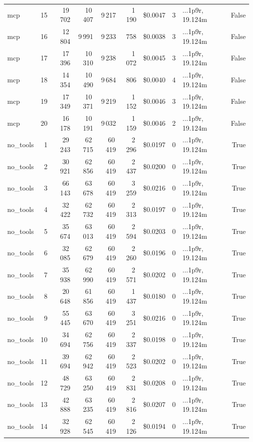 \documentclass[a4paper,11pt]{article}
\begin{document}
\begin{table}[H]
{\begin{tabular}{l r r r r r r r l r}
mcp & 15 & 19\,702 & 10\,407 & 9\,217 & 1\,190 & \$0.0047 & 3 & ...1p9r, 19.124m & False \\
mcp & 16 & 12\,804 & 9\,991 & 9\,233 & 758 & \$0.0038 & 3 & ...1p9r, 19.124m & False \\
mcp & 17 & 17\,396 & 10\,310 & 9\,238 & 1\,072 & \$0.0045 & 3 & ...1p9r, 19.124m & False \\
mcp & 18 & 14\,354 & 10\,490 & 9\,684 & 806 & \$0.0040 & 4 & ...1p9r, 19.124m & False \\
mcp & 19 & 17\,349 & 10\,371 & 9\,219 & 1\,152 & \$0.0046 & 3 & ...1p9r, 19.124m & False \\
mcp & 20 & 16\,178 & 10\,191 & 9\,032 & 1\,159 & \$0.0046 & 2 & ...1p9r, 19.124m & False \\
\midrule
no\_tools & 1 & 29\,243 & 62\,715 & 60\,419 & 2\,296 & \$0.0197 & 0 & ...1p9r, 19.124m & True \\
no\_tools & 2 & 30\,921 & 62\,856 & 60\,419 & 2\,437 & \$0.0200 & 0 & ...1p9r, 19.124m & True \\
no\_tools & 3 & 66\,143 & 63\,678 & 60\,419 & 3\,259 & \$0.0216 & 0 & ...1p9r, 19.124m & True \\
no\_tools & 4 & 32\,422 & 62\,732 & 60\,419 & 2\,313 & \$0.0197 & 0 & ...1p9r, 19.124m & True \\
no\_tools & 5 & 35\,674 & 63\,013 & 60\,419 & 2\,594 & \$0.0203 & 0 & ...1p9r, 19.124m & True \\
no\_tools & 6 & 32\,085 & 62\,679 & 60\,419 & 2\,260 & \$0.0196 & 0 & ...1p9r, 19.124m & True \\
no\_tools & 7 & 35\,938 & 62\,990 & 60\,419 & 2\,571 & \$0.0202 & 0 & ...1p9r, 19.124m & True \\
no\_tools & 8 & 20\,648 & 61\,856 & 60\,419 & 1\,437 & \$0.0180 & 0 & ...1p9r, 19.124m & True \\
no\_tools & 9 & 55\,445 & 63\,670 & 60\,419 & 3\,251 & \$0.0216 & 0 & ...1p9r, 19.124m & True \\
no\_tools & 10 & 34\,694 & 62\,756 & 60\,419 & 2\,337 & \$0.0198 & 0 & ...1p9r, 19.124m & True \\
no\_tools & 11 & 39\,694 & 62\,942 & 60\,419 & 2\,523 & \$0.0202 & 0 & ...1p9r, 19.124m & True \\
no\_tools & 12 & 48\,729 & 63\,250 & 60\,419 & 2\,831 & \$0.0208 & 0 & ...1p9r, 19.124m & True \\
no\_tools & 13 & 42\,888 & 63\,235 & 60\,419 & 2\,816 & \$0.0207 & 0 & ...1p9r, 19.124m & True \\
no\_tools & 14 & 32\,928 & 62\,545 & 60\,419 & 2\,126 & \$0.0194 & 0 & ...1p9r, 19.124m & True \\

\end{tabular}}
\end{table}
\end{document}
